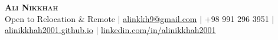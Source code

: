 \begin{center}
  \textbf{\Huge \scshape Ali Nikkhah} \\ \vspace{2pt}
  \small
  Open to Relocation \& Remote $|$
  \href{mailto:alinkkh9@gmail.com}{alinkkh9@gmail.com} $|$
  +98 991 296 3951 $|$
  \href{https://alinikkhah2001.github.io}{alinikkhah2001.github.io} $|$
  \href{https://linkedin.com/in/alinikkhah2001}{linkedin.com/in/alinikkhah2001}
\end{center}
